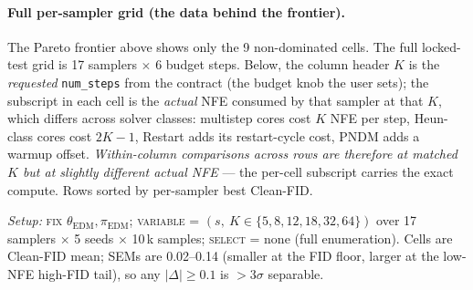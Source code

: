 \documentclass[11pt]{article}
\begin{document}
\paragraph{Full per-sampler grid (the data behind the frontier).}
The Pareto frontier above shows only the 9 non-dominated cells. The
full locked-test grid is 17 samplers \(\times\) 6 budget steps. Below,
the column header \(K\) is the \emph{requested} \texttt{num\_steps}
from the contract (the budget knob the user sets); the subscript in
each cell is the \emph{actual} NFE consumed by that sampler at that
\(K\), which differs across solver classes: multistep cores cost
\(K\) NFE per step, Heun-class cores cost \(2K{-}1\), Restart adds
its restart-cycle cost, PNDM adds a warmup offset. \emph{Within-column
comparisons across rows are therefore at matched \(K\) but at slightly
different actual NFE} --- the per-cell subscript carries the exact
compute. Rows sorted by per-sampler best Clean-FID.

\noindent\textit{Setup:} \textsc{fix} \(\theta_{\mathrm{EDM}},
\pi_{\mathrm{EDM}}\); \textsc{variable} = \((s,\ K \in \{5,8,12,18,32,64\})\)
over 17 samplers \(\times\) 5 seeds \(\times\) 10\,k samples;
\textsc{select} = none (full enumeration). Cells are Clean-FID mean;
SEMs are 0.02--0.14 (smaller at the FID floor, larger at the low-NFE
high-FID tail), so any \(|\Delta| \ge 0.1\) is \(>3\sigma\) separable.
\end{document}
